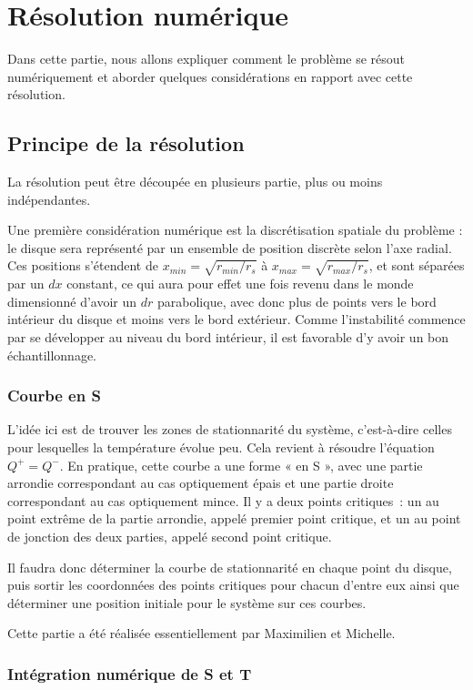 \section{Résolution numérique}

Dans cette partie, nous allons expliquer comment le problème se résout
numériquement et aborder quelques considérations en rapport avec cette
résolution.

\subsection{Principe de la résolution}
La résolution peut être découpée en plusieurs partie, plus ou moins
indépendantes.

Une première considération numérique est la discrétisation spatiale du problème
: le disque sera représenté par un ensemble de position discrète selon l’axe
radial. Ces positions s’étendent de $x_{min} = \sqrt{r_{min}/r_s}$ à $x_{max} =
\sqrt{r_{max}/r_s}$, et sont séparées par un $dx$ constant, ce qui aura pour
effet une fois revenu dans le monde dimensionné d’avoir un $dr$ parabolique,
avec donc plus de points vers le bord intérieur du disque et moins vers le bord
extérieur. Comme l'instabilité commence par se développer au niveau du bord intérieur, il est favorable d'y avoir un bon échantillonnage.

\subsubsection{Courbe en S}

L’idée ici est de trouver les zones de stationnarité du système, c’est-à-dire
celles pour lesquelles la température évolue peu. Cela revient à résoudre
l’équation $Q^+ = Q^-$. En pratique, cette courbe a une forme « en S », avec
une partie arrondie correspondant au cas optiquement épais et une partie droite
correspondant au cas optiquement mince. Il y a deux points critiques : un au
point extrême de la partie arrondie, appelé premier point critique, et un au
point de jonction des deux parties, appelé second point critique.

Il faudra donc déterminer la courbe de stationnarité en chaque point du disque,
puis sortir les coordonnées des points critiques pour chacun d’entre eux ainsi
que déterminer une position initiale pour le système sur ces courbes.

Cette partie a été réalisée essentiellement par Maximilien et Michelle.

\subsubsection{Intégration numérique de S et T}

